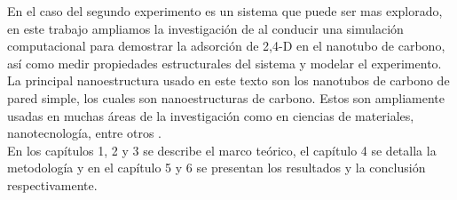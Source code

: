 En el caso del segundo experimento es un sistema que puede ser mas explorado, en este trabajo ampliamos la investigación de \cite{rocha2017} al conducir una simulación computacional para demostrar la adsorción de 2,4-D en el nanotubo de carbono, así como medir propiedades estructurales del sistema y modelar el experimento.\\

La principal nanoestructura usado en este texto son los nanotubos de carbono de pared simple, los cuales son nanoestructuras de carbono. Estos son ampliamente usadas en muchas áreas de la investigación como en ciencias de materiales, nanotecnología, entre otros \cite{KAUR2019}\cite{SARKAR2018}. \\

En los capítulos 1, 2 y 3 se describe el marco teórico, el capítulo 4 se detalla la metodología y en el capítulo 5 y 6 se presentan los resultados y la conclusión respectivamente.





